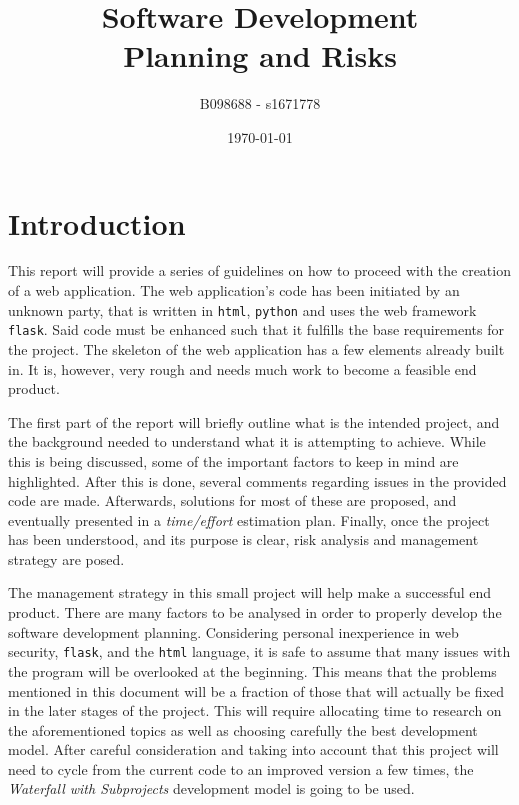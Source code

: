\documentclass[12pt,a4paper]{article}
\begin{document}
\title{Software Development\\Planning and Risks}
\author{B098688 - s1671778}
\date{\today}

\makeEPCCtitle

\thispagestyle{empty}

\newpage


\tableofcontents


\newpage
{}

\section{Introduction}

This report will provide a series of guidelines on how to proceed with the creation of a web application. The web application's code has been initiated by an unknown party, that is written in \texttt{html}, \texttt{python} and uses the web framework \texttt{flask}. Said code must be enhanced such that it fulfills the base requirements for the project. The skeleton of the web application has a few elements already built in. It is, however, very rough and needs much work to become a feasible end product. 

The first part of the report will briefly outline what is the intended project, and the background needed to understand what it is attempting to achieve. While this is being discussed, some of the important factors to keep in mind are highlighted. After this is done, several comments regarding issues in the provided code are made. Afterwards, solutions for most of these are proposed, and eventually presented in a \textit{time/effort} estimation plan. Finally, once the project has been understood, and its purpose is clear, risk analysis and management strategy are posed.

The management strategy in this small project will help make a successful end product. There are many factors to be analysed in order to properly develop the software development planning. Considering personal inexperience in web security, \texttt{flask}, and the \texttt{html} language, it is safe to assume that many issues with the program will be overlooked at the beginning. This means that the problems mentioned in this document will be a fraction of those that will actually be fixed in the later stages of the project. This will require allocating time to research on the aforementioned topics as well as choosing carefully the best development model. After careful consideration and taking into account that this project will need to cycle from the current code to an improved version a few times, the \textit{Waterfall with Subprojects} development model is going to be used.
\end{document}

